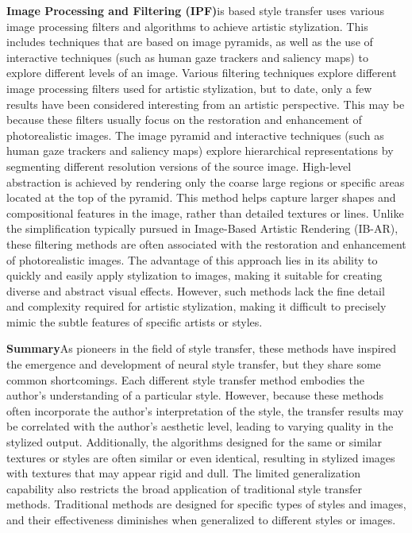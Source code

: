 \textbf{Image Processing and Filtering (IPF)}is based style transfer uses various image processing filters and algorithms to achieve artistic stylization. This includes techniques that are based on image pyramids, as well as the use of interactive techniques (such as human gaze trackers and saliency maps) to explore different levels of an image. Various filtering techniques explore different image processing filters used for artistic stylization, but to date, only a few results have been considered interesting from an artistic perspective. This may be because these filters usually focus on the restoration and enhancement of photorealistic images. The image pyramid and interactive techniques (such as human gaze trackers and saliency maps) explore hierarchical representations by segmenting different resolution versions of the source image. High-level abstraction is achieved by rendering only the coarse large regions or specific areas located at the top of the pyramid. This method helps capture larger shapes and compositional features in the image, rather than detailed textures or lines. Unlike the simplification typically pursued in Image-Based Artistic Rendering (IB-AR), these filtering methods are often associated with the restoration and enhancement of photorealistic images. The advantage of this approach lies in its ability to quickly and easily apply stylization to images, making it suitable for creating diverse and abstract visual effects. However, such methods lack the fine detail and complexity required for artistic stylization, making it difficult to precisely mimic the subtle features of specific artists or styles.

\textbf{Summary}\quad As pioneers in the field of style transfer, these methods have inspired the emergence and development of neural style transfer, but they share some common shortcomings. Each different style transfer method embodies the author's understanding of a particular style. However, because these methods often incorporate the author's interpretation of the style, the transfer results may be correlated with the author's aesthetic level, leading to varying quality in the stylized output. Additionally, the algorithms designed for the same or similar textures or styles are often similar or even identical, resulting in stylized images with textures that may appear rigid and dull. The limited generalization capability also restricts the broad application of traditional style transfer methods. Traditional methods are designed for specific types of styles and images, and their effectiveness diminishes when generalized to different styles or images.